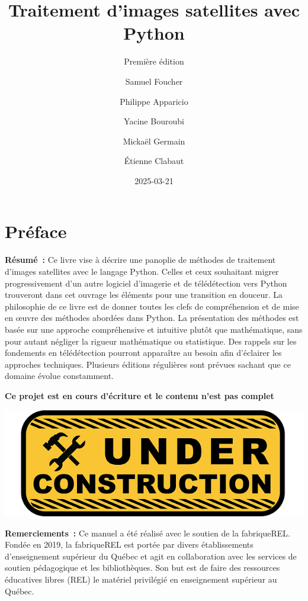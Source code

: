 \documentclass[
  11pt,
  letterpaper,
  open=any,
  twoside=false,
  french]{scrbook}
\title{Traitement d'images satellites avec Python}
\subtitle{Première édition}
\author{Samuel Foucher \and Philippe Apparicio \and Yacine
Bouroubi \and Mickaël Germain \and Étienne Clabaut}
\date{2025-03-21}
\renewcommand*\contentsname{Table des matières}
\newcommand\contentsname{Table des matières}
\begin{document}
\frontmatter
\maketitle

\renewcommand*\contentsname{Table des matières}
{
\hypersetup{linkcolor=}
\setcounter{tocdepth}{2}
\tableofcontents
}
\listoffigures
\listoftables

\mainmatter
{}

\chapter*{Préface}\label{pruxe9face}


\renewcommand{\partname}{} %

\textbf{Résumé~:} Ce livre vise à décrire une panoplie de méthodes de
traitement d'images satellites avec le langage Python. Celles et ceux
souhaitant migrer progressivement d'un autre logiciel d'imagerie et de
télédétection vers Python trouveront dans cet ouvrage les éléments pour
une transition en douceur. La philosophie de ce livre est de donner
toutes les clefs de compréhension et de mise en œuvre des méthodes
abordées dans Python. La présentation des méthodes est basée sur une
approche compréhensive et intuitive plutôt que mathématique, sans pour
autant négliger la rigueur mathématique ou statistique. Des rappels sur
les fondements en télédétection pourront apparaître au besoin afin
d'éclairer les approches techniques. Plusieurs éditions régulières sont
prévues sachant que ce domaine évolue constamment.

\textbf{Ce projet est en cours d'écriture et le contenu n'est pas
complet}

\includegraphics[width=0.5\linewidth,height=\textheight,keepaspectratio]{images/logos/under-construction-2408062_640.png}\hfill

\textbf{Remerciements~:} Ce manuel a été réalisé avec le soutien de la
fabriqueREL. Fondée en 2019, la fabriqueREL est portée par divers
établissements d'enseignement supérieur du Québec et agit en
collaboration avec les services de soutien pédagogique et les
bibliothèques. Son but est de faire des ressources éducatives libres
(REL) le matériel privilégié en enseignement supérieur au Québec.
\end{document}
